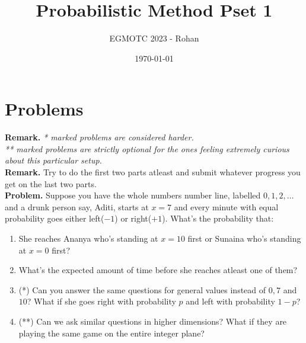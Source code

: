 \documentclass[12pt]{article}
\title{Probabilistic Method Pset 1}
\author{EGMOTC 2023 - Rohan}
\date{\today}
\begin{document}
\maketitle

\newcommand{\localtextbulletone}{\textcolor{black}{\raisebox{.45ex}{\rule{.6ex}{.6ex}}}}
\renewcommand{\labelitemi}{\localtextbulletone}

\section*{Problems}
\vspace{1cm}
\thispagestyle{empty}

\textbf{Remark.} \textit{* marked problems are considered harder.\\ ** marked problems are strictly optional for the ones feeling extremely curious about this particular setup.\\}
\textbf{Remark.} Try to do the first two parts atleast and submit whatever progress you get on the last two parts.\\

\textbf{Problem.} Suppose you have the whole numbers number line, labelled $0,1,2,\ldots$ and a drunk person say, Aditi, starts at $x=7$ and every minute with equal probability goes either left($-1$) or right($+1$). What's the probability that:
    \begin{enumerate}
        \item She reaches Ananya who's standing at $x=10$ first or Sunaina who's standing at $x=0$ first?
        \item What's the expected amount of time before she reaches atleast one of them?
        \item (*) Can you answer the same questions for general values instead of $0,7$ and $10$? What if she goes right with probability $p$ and left with probability $1-p$?
        \item (**) Can we ask similar questions in higher dimensions? What if they are playing the same game on the entire integer plane?
    \end{enumerate}
\end{document}
